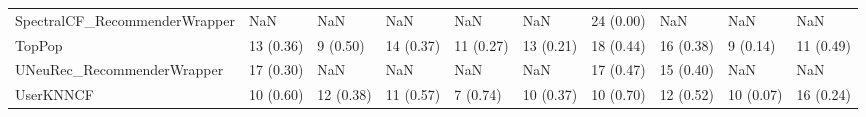 \begin{tabular}{llllllllll}
      SpectralCF\_RecommenderWrapper &                      NaN &         NaN &           NaN &          NaN &                  NaN &           24 (0.00) &               NaN &                NaN &               NaN \\
                             TopPop &                13 (0.36) &    9 (0.50) &     14 (0.37) &    11 (0.27) &            13 (0.21) &           18 (0.44) &         16 (0.38) &           9 (0.14) &         11 (0.49) \\
         UNeuRec\_RecommenderWrapper &                17 (0.30) &         NaN &           NaN &          NaN &                  NaN &           17 (0.47) &         15 (0.40) &                NaN &               NaN \\
                          UserKNNCF &                10 (0.60) &   12 (0.38) &     11 (0.57) &     7 (0.74) &            10 (0.37) &           10 (0.70) &         12 (0.52) &          10 (0.07) &         16 (0.24) \\
\bottomrule
\end{tabular}
